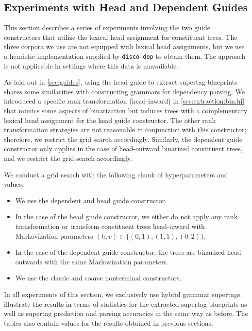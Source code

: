 \documentclass[../../document.tex]{subfiles}
\begin{document}
    \subsection{Experiments with Head and Dependent Guides}\label{sec:gridsearch:head}
    This section describes a series of experiments involving the two guide constructors that utilize the lexical head assignment for constituent trees.
    The three corpora we use are not equipped with lexical head assignments, but we use a heuristic implementation supplied by \texttt{disco-dop} to obtain them.
    The approach is not applicable in settings where this data is unavailable.

    As laid out in \cref{sec:guides}, using the head guide to extract supertag blueprints shares some similarities with constructing grammars for dependency parsing.
    We introduced a specific rank transformation (head-inward) in \cref{sec:extraction:bin:hi} that mimics some aspects of binarization but induces trees with a complementary lexical head assignment for the head guide constructor.
    The other rank transformation strategies are not reasonable in conjunction with this constructor; therefore, we restrict the grid search accordingly.
    Similarly, the dependent guide constructor only applies in the case of head-outward binarized constituent trees, and we restrict the grid search accordingly.

    We conduct a grid search with the following chunk of hyperparameters and values:
    \begin{itemize}
        \item We use the dependent and head guide constructor.
        \item In the case of the head guide constructor, we either do not apply any rank transformation or transform constituent trees head-inward with Markovization parameters $(h,v) \in \{(0,1), (1,1), (0,2)\}$.
        \item In the case of the dependent guide constructor, the trees are binarized head-outwards with the same Markovization parameters.
        \item We use the classic and coarse nonterminal constructors.
    \end{itemize}
    In all experiments of this section, we exclusively use hybrid grammar supertags.
     illustrate the results in terms of statistics for the extracted supertag blueprints as well as supertag prediction and parsing accuracies in the same way as before.
    The tables also contain values for the results obtained in previous sections.
\end{document}
